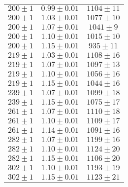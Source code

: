 \begin{figure}[h!]
\begin{minipage}{0.49\textwidth}
\begin{tabular}{ccc}
\midrule
$200	\pm 1 $	 	&	$0.99 \pm 0.01 $	&	$1104 \pm 	11$	\\
$200	\pm 1 $		&	$1.03 \pm 0.01 $	&	$1077 \pm 	10$	\\
$200	\pm 1 $		&	$1.07 \pm 0.01 $	&	$1041 \pm 	9$	\\
$200	\pm 1 $		&	$1.10 \pm 0.01 $	&	$1015 \pm 	10$	\\
$200	\pm 1 $		&	$1.15 \pm 0.01 $	&	$935 \pm  	11$	\\
$219	\pm 1 $		&	$1.03 \pm 0.01 $	&	$1108 \pm 	16$	\\
$219	\pm 1 $		&	$1.07 \pm 0.01 $	&	$1097 \pm 	13$	\\
$219	\pm 1 $		&	$1.10 \pm 0.01 $	&	$1056 \pm 	16$	\\
$219	\pm 1 $		&	$1.15 \pm 0.01 $	&	$1044 \pm 	16$	\\
$239	\pm 1 $		&	$1.07 \pm 0.01 $	&	$1099 \pm 	18$	\\
$239	\pm 1 $		&	$1.15 \pm 0.01 $	&	$1075 \pm 	17$	\\
$261	\pm 1 $		&	$1.07 \pm 0.01 $	&	$1110 \pm 	18$	\\
$261	\pm 1 $		&	$1.10 \pm 0.01 $	&	$1109 \pm 	17$	\\
$261	\pm 1 $		&	$1.14 \pm 0.01 $	&	$1091 \pm 	16$	\\
$282	\pm 1 $		&	$1.07 \pm 0.01 $	&	$1199 \pm 	16$	\\
$282	\pm 1 $		&	$1.10 \pm 0.01 $	&	$1124 \pm 	20$	\\
$282	\pm 1 $		&	$1.15 \pm 0.01 $	&	$1106 \pm 	20$	\\
$302	\pm 1 $		&	$1.10 \pm 0.01 $	&	$1193 \pm 	19$	\\
$302	\pm 1 $		&	$1.15 \pm 0.01 $	&	$1123 \pm 	21$	\\
\bottomrule
\end{tabular}
\label{dati_raggi}
\end{minipage}

\end{figure}

	
	
	
	
	
	
	
	
	
	
	
	
	
	
	
	
	
	
	
	
	
	